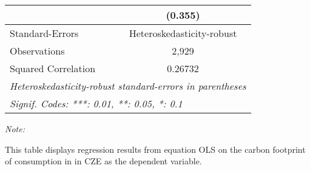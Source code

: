 \begin{table}[htbp!]
\begin{adjustbox}{width = 1\textwidth, max height = 0.95\textheight, center}
\begin{threeparttable}[b]
\begin{tabular}{lc}
                                & (0.355)\\   
            \midrule 
            Standard-Errors     & Heteroskedasticity-robust \\   
            Observations        & 2,929\\  
            Squared Correlation & 0.26732\\  
            \midrule \midrule
            \multicolumn{2}{l}{\emph{Heteroskedasticity-robust standard-errors in parentheses}}\\
            \multicolumn{2}{l}{\emph{Signif. Codes: ***: 0.01, **: 0.05, *: 0.1}}\\
         \end{tabular}
         
         \begin{tablenotes}\item \medskip \textit{Note:}
            \item This table displays regression results from equation OLS on the carbon footprint of consumption in  in CZE as the dependent variable.  
         \end{tablenotes}
      \end{threeparttable}
   \end{adjustbox}
\end{table}


